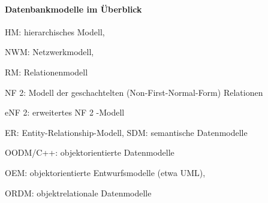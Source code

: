 \documentclass[a4paper]{article}
\begin{document}
\begin{multicols}{3}
    \paragraph{Datenbankmodelle im Überblick}
    \begin{itemize*}
        \item HM: hierarchisches Modell, 
        \item NWM: Netzwerkmodell, 
        \item RM: Relationenmodell
        \item NF 2: Modell der geschachtelten (Non-First-Normal-Form) Relationen
        \item eNF 2: erweitertes NF 2 -Modell
        \item ER: Entity-Relationship-Modell, SDM: semantische Datenmodelle
        \item OODM/C++: objektorientierte Datenmodelle
        \begin{itemize*}
            \item OEM: objektorientierte Entwurfsmodelle (etwa UML),
            \item ORDM: objektrelationale Datenmodelle
        \end{itemize*}
    \end{itemize*}


\end{multicols}
\end{document}
